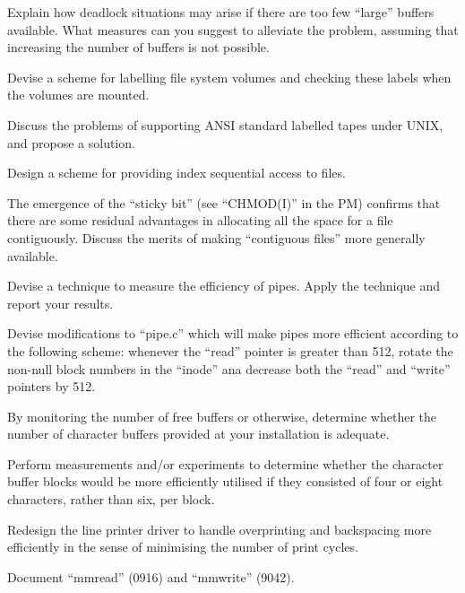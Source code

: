 \item[3.5] Explain how deadlock situations may
arise if there are too few ``large''
buffers available. What measures can
you suggest to alleviate the problem,
assuming that increasing the number of
buffers is not possible.
\ed


\bd
\item[4.1] Devise a scheme for labelling file
system volumes and checking these
labels when the volumes are mounted.

\item[4.2] Discuss the problems of supporting
ANSI standard labelled tapes under
UNIX, and propose a solution.

\item[4.3] Design a scheme for providing index
sequential access to files.

\item[4.4] The emergence of the ``sticky bit''
(see ``CHMOD(I)'' in the PM) confirms
that there are some residual advantages
in allocating all the space for a file
contiguously. Discuss the merits of
making ``contiguous files'' more generally available.

\item[4.5] Devise a technique to measure the
efficiency of pipes. Apply the technique and report your results.

\item[4.6] Devise modifications to ``pipe.c''
which will make pipes more efficient
according to the following scheme:
whenever the ``read'' pointer is greater
than 512, rotate the non-null block
numbers in the ``inode'' ana decrease
both the ``read'' and ``write'' pointers by
512.

\item[5.1] By monitoring the number of free
buffers or otherwise, determine whether
the number of character buffers provided at your installation is adequate.

\item[5.2] Perform measurements and/or experiments
to determine whether the character buffer
blocks would be more efficiently utilised if they consisted of
four or eight characters, rather than
six, per block.

\item[5.3] Redesign the line printer driver to
handle overprinting and backspacing
more efficiently in the sense of
minimising the number of print cycles.

\item[5.4] Document ``mmread'' (0916) and
``mmwrite'' (9042).
\ed
{}

